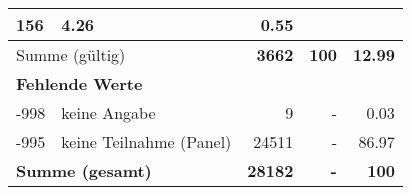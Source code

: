 \begin{longtable}{lXrrr}
       \num{156} &
       \num[round-mode=places,round-precision=2]{4,26} &
         \num[round-mode=places,round-precision=2]{0,55} \\
     \midrule
     \multicolumn{2}{l}{Summe (gültig)} &
       \textbf{\num{3662}} &
     \textbf{100} &
       \textbf{\num[round-mode=places,round-precision=2]{12,99}} \\
     \multicolumn{5}{l}{\textbf{Fehlende Werte}}\\
       -998 &
       keine Angabe &
         \num{9} &
        - &
         \num[round-mode=places,round-precision=2]{0,03} \\
       -995 &
       keine Teilnahme (Panel) &
         \num{24511} &
        - &
         \num[round-mode=places,round-precision=2]{86,97} \\
     \midrule
     \multicolumn{2}{l}{\textbf{Summe (gesamt)}} &
          \textbf{\num{28182}} &
        \textbf{-} &
        \textbf{100} \\
     \bottomrule
     \end{longtable}
     
